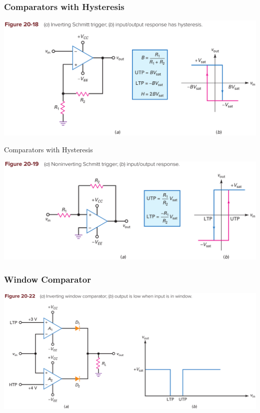 \documentclass[pdflatex,compress]{beamer}
\begin{document}
\begin{frame}
	\frametitle{Comparators with Hysteresis}
	\begin{center}
		\includegraphics[width=1\linewidth]{img/2018-2}
	\end{center}
\end{frame}

\begin{frame}{Comparators with Hysteresis}
	\begin{center}
		\includegraphics[width=1\linewidth]{img/2019-2}
	\end{center}
\end{frame}

\begin{frame}
	\frametitle{Window Comparator}
	\begin{center}
		\includegraphics[width=1\linewidth]{img/2022}
	\end{center}
\end{frame}
\end{document}
